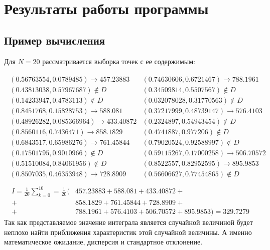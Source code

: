 \section{Результаты работы программы}
\subsection{Пример вычисления}
Для \(N = 20\) рассматривается выборка точек с ее содержимым:

\begin{align*}
	\begin{array}{ll}
		(0.56763554,0.0789485) \to 457.23883   & (0.74630606,0.6721467) \to 788.1961   \\
		(0.43813038,0.57967687) \not\in D      & (0.34509814,0.5507567) \not\in D      \\
		(0.14233947,0.4783113) \not\in D       & (0.032078028,0.31770563) \not\in D    \\
		(0.8451768,0.15828753) \to 588.081     & (0.37217999,0.48739147) \to 576.4103  \\
		(0.48926282,0.085366964) \to 433.40872 & (0.2324897,0.54943454) \not\in D      \\
		(0.8560116,0.7436471) \to 858.1829     & (0.4741887,0.977206) \not\in D        \\
		(0.6843517,0.65986276) \to 761.45844   & (0.79020524,0.92588997) \not\in D     \\
		(0.17501795,0.9010966) \not\in D       & (0.59115267,0.17000258) \to 506.70572 \\
		(0.51510084,0.84061956) \not\in D      & (0.8522557,0.82952595) \to 895.9853   \\
		(0.8507035,0.46353948) \to 728.8909    & (0.56606627,0.77454865) \not\in D     \\
	\end{array}
\end{align*}
\begin{align*}
	I = \frac{1}{20}\sum_{k=0}^{10}=\frac{1}{20}( & 457.23883+588.081+433.40872+                     \\
	+                                             & 858.1829+761.45844+728.8909+                     \\
	+                                             & 788.1961+576.4103+506.70572+895.9853) = 329.7279
\end{align*}
Так как представляемое значение интеграла является случайной величиной будет неплохо найти приближения характеристик этой случайной величины. А именно математическое ожидание, дисперсия и стандартное отклонение.
